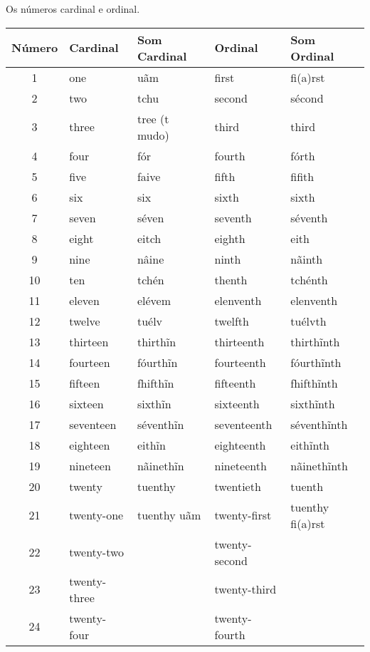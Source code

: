Os números cardinal e ordinal.
\begin{center}
  \begin{tabular}{ |c|p{3cm}|p{3cm}|p{3cm}|p{3cm}| }
    \hline
    Número& Cardinal& Som Cardinal& Ordinal& Som Ordinal \\
    \hline
    1& one& uãm& first& fi(a)rst \\
    \hline
    2& two& tchu& second& sécond \\
    \hline
    3& three& tree (t mudo)& third& third \\
    \hline
    4& four& fór& fourth& fórth \\
    \hline
    5& five& faive& fifth& fifith \\
    \hline
    6& six& six& sixth& sixth \\
    \hline
    7& seven& séven& seventh& séventh \\
    \hline
    8& eight& eitch& eighth& eith \\
    \hline
    9& nine& nâine& ninth& nãinth \\
    \hline
    10& ten& tchén& thenth& tchénth \\
    \hline
    11& eleven& elévem& elenventh& elenventh \\
    \hline
    12& twelve& tuélv& twelfth& tuélvth \\
    \hline
    13& thirteen& thirthĩn& thirteenth& thirthĩnth \\
    \hline
    14& fourteen& fóurthĩn& fourteenth& fóurthĩnth \\
    \hline
    15& fifteen& fhifthĩn& fifteenth& fhifthĩnth \\
    \hline
    16& sixteen& sixthĩn& sixteenth& sixthĩnth \\
    \hline
    17& seventeen& séventhĩn& seventeenth& séventhĩnth \\
    \hline
    18& eighteen& eithĩn& eighteenth& eithĩnth \\
    \hline
    19& nineteen& nãinethĩn& nineteenth& nãinethĩnth  \\
    \hline
    20& twenty& tuenthy& twentieth& tuenth \\
    \hline
    21& twenty-one& tuenthy uãm& twenty-first& tuenthy fi(a)rst \\
    \hline
    22& 	twenty-two&     & twenty-second& \\
    \hline
    23& 	twenty-three& 	& twenty-third& \\
    \hline
    24& 	twenty-four& 	& twenty-fourth& \\

\end{tabular}
\end{center}

